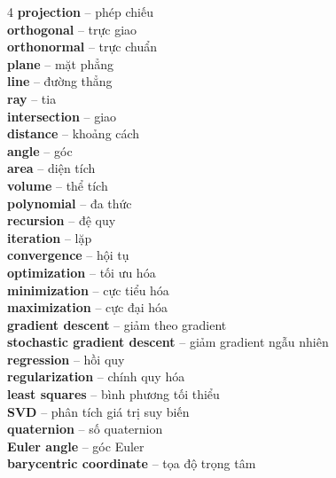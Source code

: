 \begin{multicols}{4}
\textbf{projection} -- phép chiếu\\
\textbf{orthogonal} -- trực giao\\
\textbf{orthonormal} -- trực chuẩn\\
\textbf{plane} -- mặt phẳng\\
\textbf{line} -- đường thẳng\\
\textbf{ray} -- tia\\
\textbf{intersection} -- giao\\
\textbf{distance} -- khoảng cách\\
\textbf{angle} -- góc\\
\textbf{area} -- diện tích\\
\textbf{volume} -- thể tích\\
\textbf{polynomial} -- đa thức\\
\textbf{recursion} -- đệ quy\\
\textbf{iteration} -- lặp\\
\textbf{convergence} -- hội tụ\\
\textbf{optimization} -- tối ưu hóa\\
\textbf{minimization} -- cực tiểu hóa\\
\textbf{maximization} -- cực đại hóa\\
\textbf{gradient descent} -- giảm theo gradient\\
\textbf{stochastic gradient descent} -- giảm gradient ngẫu nhiên\\
\textbf{regression} -- hồi quy\\
\textbf{regularization} -- chính quy hóa\\
\textbf{least squares} -- bình phương tối thiểu\\
\textbf{SVD} -- phân tích giá trị suy biến\\
\textbf{quaternion} -- số quaternion\\
\textbf{Euler angle} -- góc Euler\\
\textbf{barycentric coordinate} -- tọa độ trọng tâm\\


\end{multicols}
